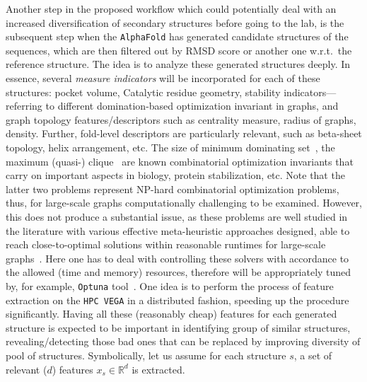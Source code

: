 \documentclass[runningheads]{llncs}
\begin{document}
	Another step in the proposed workflow which could potentially deal with an increased  diversification of secondary structures before going to the lab, is the subsequent step when the \texttt{AlphaFold} has generated candidate structures of the sequences, which are then filtered out by RMSD score or another one w.r.t.\ the reference structure.  The idea is to analyze these generated structures deeply. In essence,	several \textit{measure indicators} will be incorporated for each of these structures:  pocket volume, Catalytic residue geometry, {stability indicators}---referring to different domination-based optimization invariant in graphs, and graph topology features/descriptors such as centrality measure, radius of graphs, density. Further,  fold-level descriptors are particularly relevant, such as beta-sheet topology,	helix arrangement, etc. The size of minimum dominating set~\cite{nacher2016minimum,milenkovic2011dominating}, the maximum (quasi-) clique~\cite{bhattacharyya2009mining} are known combinatorial optimization invariants that carry on important aspects in biology, protein stabilization, etc. Note that the latter two problems represent NP-hard combinatorial optimization problems, thus, for large-scale graphs computationally challenging to be examined. However, this does not produce a substantial issue, as these problems are well studied in the literature with various effective meta-heuristic approaches designed, able to reach close-to-optimal solutions within reasonable runtimes for large-scale graphs~\cite{lin2016effective,pullan2011cooperating}. Here one has to deal with controlling these solvers with accordance to the allowed (time and memory) resources, therefore will be appropriately tuned by, for example,  \texttt{Optuna} tool~\cite{agrawal2020optuna}.  One idea is to perform the process of feature extraction on the \texttt{HPC VEGA}  in a distributed fashion, speeding up the procedure significantly. Having all these (reasonably cheap) features for each generated structure is expected to be important in identifying group of similar structures, revealing/detecting those bad ones that can be replaced by improving diversity of pool of structures. Symbolically, let us assume  for each structure $s$, a set of relevant ($d$) features $x_s \in \mathbb R^d $ is extracted. 
\end{document}
